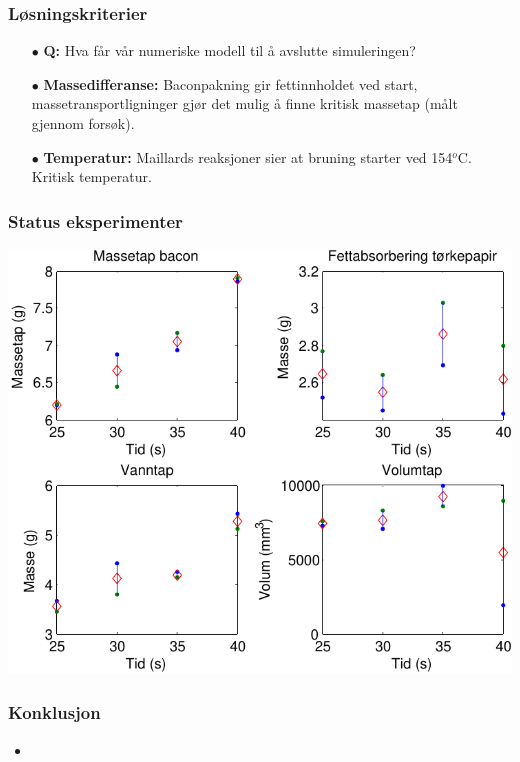 \documentclass[screen]{beamer}
\begin{document}
\begin{frame}
  \frametitle{Løsningskriterier}
  \begin{center}
  \begin{itemize}  
    \item[$\bullet$] \textbf{Q:} Hva får vår numeriske modell
      til å avslutte simuleringen?

    \item[$\bullet$] \textbf{Massedifferanse:} Baconpakning gir fettinnholdet ved start,
  massetransportligninger gjør det mulig å finne kritisk massetap (målt gjennom forsøk).

\item[$\bullet$] \textbf{Temperatur:} Maillards reaksjoner sier at bruning starter ved
  154$^o$C. Kritisk temperatur.
  \end{itemize}
  \end{center}
\end{frame}

\begin{frame}
  \frametitle{Status eksperimenter}
    \begin{center}
      \includegraphics[width=0.7\linewidth]{eksperiment.pdf}
    \end{center}
\end{frame}

\begin{frame}
  \frametitle{Konklusjon}
  \begin{itemize}
    \item 
  \end{itemize}
\end{frame}
\end{document}
